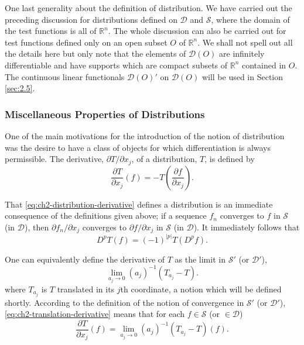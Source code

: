 One last generality about the definition of distribution. We have carried out
the preceding discussion for distributions defined on $\mathcal{D}$ and
$\mathcal{S}$, where the domain of the test functions is all of $\mathbb{R}^n$.
The whole discussion can also be carried out for test functions defined only
on an open subset $O$ of $\mathbb{R}^n$. We shall not spell out all the details
here but only note that the elements of $\mathcal{D}(O)$ are infinitely
differentiable and have supports which are compact subsets of $\mathbb{R}^n$
contained in $O$. The continuous linear functionals $\mathcal{D}(O)'$ on
$\mathcal{D}(O)$ will be used in Section \ref{sec:2.5}.

\subsubsection*{Miscellaneous Properties of Distributions}

One of the main motivations for the introduction of the notion of distribution
was the desire to have a class of objects for which differentiation is always
permissible. The derivative, $\partial T/\partial x_j$, of a distribution, $T$,
is defined by
\begin{equation}
  \frac{\partial T}{\partial x_j}(f)=-T\left(\frac{\partial f}{\partial x_j}\right).
\tag{2-14}\label{eq:ch2-distribution-derivative}
\end{equation}

That \eqref{eq:ch2-distribution-derivative} defines a distribution is an immediate consequence of the
definitions given above; if a sequence $f_n$ converges to $f$ in $\mathcal{S}$
(in $\mathcal{D}$), then $\partial f_n/\partial x_j$ converges to
$\partial f/\partial x_j$ in $\mathcal{S}$ (in $\mathcal{D}$). It immediately
follows that
\begin{equation}
  D^pT(f)=(-1)^{|p|}T(D^pf).
\tag{2-15}\label{eq:ch2-distribution-multi-derivative}
\end{equation}

One can equivalently define the derivative of $T$ as the limit in
$\mathcal{S}'$ (or $\mathcal{D}'$),
\begin{equation}
  \lim_{a_j\to0}(a_j)^{-1}(T_{a_j}-T).
\tag{2-16}\label{eq:ch2-translation-derivative}
\end{equation}
where $T_{a_j}$ is $T$ translated in its $j$th coordinate, a notion which
will be defined shortly. According to the definition of the notion of
convergence in $\mathcal{S}'$ (or $\mathcal{D}'$), \eqref{eq:ch2-translation-derivative} means that for each
$f\in\mathcal{S}$ (or $\in\mathcal{D}$)
\begin{equation}
  \frac{\partial T}{\partial x_j}(f)=
  \lim_{a_j\to0}(a_j)^{-1}(T_{a_j}-T)(f).
\tag{2-17}\label{eq:ch2-translation-derivative-evaluation}
\end{equation}

